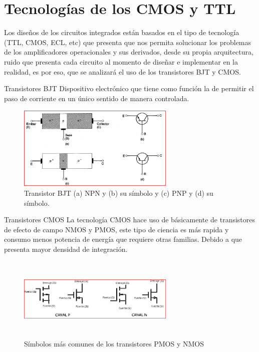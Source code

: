 \documentclass[a4paper]{article} %
\begin{document}
\setlength{\parindent}{0pt} %
	


\section{Tecnologías de los CMOS y TTL}

Los diseños de los circuitos integrados están basados en el tipo de tecnología (TTL, CMOS, ECL, etc) que presenta que nos permita solucionar los problemas de los amplificadores operacionales y sus derivados, desde su propia arquitectura, ruido que presenta cada circuito al momento de diseñar e implementar en la realidad, es por eso, que se analizará el uso de los transistores BJT y CMOS.
	\begin{paragraph}{Transistores BJT}
		Dispositivo electrónico que tiene como función la de permitir el paso de corriente en un único sentido de manera controlada.
		\begin{figure}[H]
			\centering
			\includegraphics[width=7.5cm,height=4cm]{IMAGENES/1.PNG}
			\caption{Transistor BJT (a) NPN y (b) su símbolo y (c) PNP y (d) su símbolo. \cite{1}}
			\label{f_1}
		\end{figure}
	\end{paragraph}



	\begin{paragraph}{Transistores CMOS}
		La tecnología CMOS hace uso de básicamente de transistores de efecto de campo NMOS y PMOS, este tipo de ciencia es más rapida y consumo menos potencia de energía que requiere otras familias. Debido a que presenta mayor densidad de integración.  
		\begin{figure}[!h]
			\centering
			\includegraphics[width=7.5cm,height=4cm]{IMAGENES/2.PNG}
			\caption{Símbolos más comunes de los transistores PMOS y NMOS \cite{2}}
			\label{f_2}
		\end{figure}
	\end{paragraph}
\end{document}
